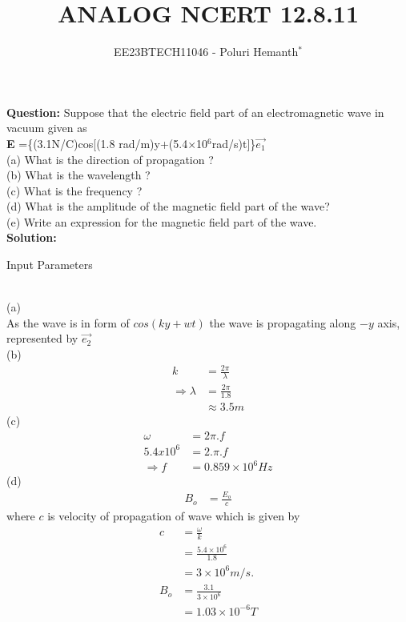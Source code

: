 \documentclass[journal,12pt,twocolumn]{IEEEtran}
\theoremstyle{remark}
\begin{document}

\vspace{3cm}

\title{ANALOG NCERT 12.8.11}
\author{EE23BTECH11046 - Poluri Hemanth$^{*}$}
\maketitle
\textbf{Question:}
Suppose that the electric field part of an electromagnetic wave
in vacuum given as\\ \textbf{E} =\{(3.1N/C)cos[(1.8 rad/m)y+(5.4$\times$10$^{6}$rad/s)t]\}$\vec{e_1}$ \\
(a) What is the direction of propagation ?\\
(b) What is the wavelength ? \\
(c) What is the frequency ?\\
(d) What is the amplitude of the magnetic field part of the wave?\\
(e) Write an expression for the magnetic field part of the wave.\\
\textbf{Solution:}
\begin{table}[h!]
    
    \caption{Input Parameters}
    \label{tab:12.8.11}
\end{table}\\
(a)\\
As the wave is in form of $cos(ky+wt)$
the wave is propagating along $-y$ axis, represented by $\vec{e_2}$\\
(b)
\begin{align}
	k&=\frac{2\pi}{\lambda} \\
	\Rightarrow\lambda&=\frac{2\pi}{1.8}\\
	&\approx3.5m
\end{align}
(c)
\begin{align} 
	\omega&=2\pi.f \\
	 5.4 x 10^{6} &=2.\pi.f \\
	\Rightarrow f &= 0.859 \times 10^{6} Hz    
\end{align}
(d)
\begin{align}
	B_o&=\frac{E_o}{c}
\end{align}
where $c$ is velocity of propagation of wave which is given by
\begin{align}
	c&=\frac{\omega}{k} \\
	&=\frac{5.4 \times 10^{6}}{1.8}\\
	&=3 \times 10^{6}m/s.\\
	B_o&= \frac{3.1}{3 \times 10^{6}}\\
	&= 1.03 \times 10^{-6}T\label{1}
\end{align}
\end{document}
